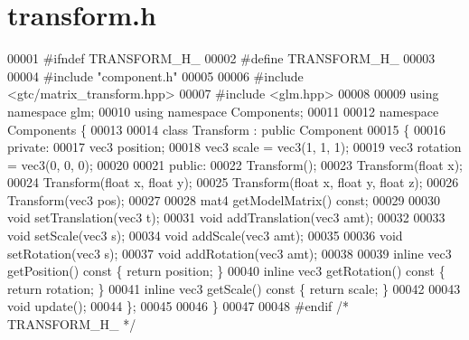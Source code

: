 \section{transform.\+h}
\label{transform_8h_source}

\begin{DoxyCode}
00001 \textcolor{preprocessor}{#ifndef TRANSFORM\_H\_}
00002 \textcolor{preprocessor}{#define TRANSFORM\_H\_}
00003 
00004 \textcolor{preprocessor}{#include "component.h"}
00005 
00006 \textcolor{preprocessor}{#include <gtc/matrix\_transform.hpp>}
00007 \textcolor{preprocessor}{#include <glm.hpp>}
00008 
00009 \textcolor{keyword}{using namespace }glm;
00010 \textcolor{keyword}{using namespace }Components;
00011 
00012 \textcolor{keyword}{namespace }Components \{
00013 
00014     \textcolor{keyword}{class }Transform : \textcolor{keyword}{public} Component
00015     \{
00016     \textcolor{keyword}{private}:
00017         vec3 position;
00018         vec3 scale    = vec3(1, 1, 1);
00019         vec3 rotation = vec3(0, 0, 0);
00020 
00021     \textcolor{keyword}{public}:
00022         Transform();
00023         Transform(\textcolor{keywordtype}{float} x);
00024         Transform(\textcolor{keywordtype}{float} x, \textcolor{keywordtype}{float} y);
00025         Transform(\textcolor{keywordtype}{float} x, \textcolor{keywordtype}{float} y, \textcolor{keywordtype}{float} z);
00026         Transform(vec3 pos);
00027 
00028         mat4 getModelMatrix() \textcolor{keyword}{const};
00029 
00030         \textcolor{keywordtype}{void} setTranslation(vec3 t);
00031         \textcolor{keywordtype}{void} addTranslation(vec3 amt);
00032 
00033         \textcolor{keywordtype}{void} setScale(vec3 s);
00034         \textcolor{keywordtype}{void} addScale(vec3 amt);
00035         
00036         \textcolor{keywordtype}{void} setRotation(vec3 s);
00037         \textcolor{keywordtype}{void} addRotation(vec3 amt);
00038 
00039         \textcolor{keyword}{inline} vec3 getPosition()\textcolor{keyword}{ const }\{ \textcolor{keywordflow}{return} position; \}
00040         \textcolor{keyword}{inline} vec3 getRotation()\textcolor{keyword}{ const }\{ \textcolor{keywordflow}{return} rotation; \}
00041         \textcolor{keyword}{inline} vec3 getScale()\textcolor{keyword}{    const }\{ \textcolor{keywordflow}{return} scale;    \}
00042 
00043         \textcolor{keywordtype}{void} update();  
00044     \};
00045 
00046 \}
00047 
00048 \textcolor{preprocessor}{#endif }\textcolor{comment}{/* TRANSFORM\_H\_ */}\textcolor{preprocessor}{}
\end{DoxyCode}
